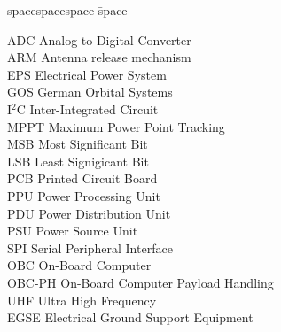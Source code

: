 
\begin{tabbing}
spacespacespace \= space \kill

ADC  \> Analog to Digital Converter\\
ARM \>  Antenna release mechanism\\
EPS \>      Electrical Power System\\
GOS \> German Orbital Systems\\
I$^2$C \>   Inter-Integrated Circuit\\
MPPT \>    Maximum Power Point Tracking\\
MSB \>      Most Significant Bit\\
LSB \>      Least Signigicant Bit\\
PCB \> Printed Circuit Board\\
PPU \> Power Processing Unit\\
PDU \> Power Distribution Unit\\
PSU \> Power Source Unit\\
SPI \> Serial Peripheral Interface\\ 
OBC \> On-Board Computer\\
OBC-PH \> On-Board Computer Payload Handling\\
UHF \> Ultra High Frequency\\
EGSE \> Electrical Ground Support Equipment\\

\end{tabbing}
\endinput
